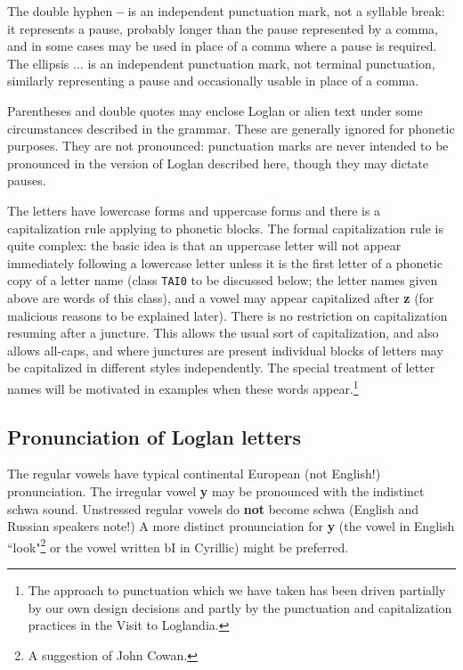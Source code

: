 \documentclass[12pt]{book}
\begin{document}
The double hyphen {\bf --} is an independent punctuation mark, not a syllable break:  it represents a pause, probably longer than the pause represented by a comma, and in some cases may be used in place of a comma where a pause is required.  The ellipsis $\ldots$ is an independent punctuation mark, not terminal punctuation, similarly representing a pause and occasionally usable in place of a comma.

Parentheses and double quotes may enclose Loglan or alien text  under some circumstances described in the grammar.  These are generally ignored for phonetic purposes.  They are not pronounced:  punctuation marks are never intended to be pronounced in the version of Loglan described here, though they may dictate pauses.

The letters have lowercase forms and uppercase forms and there is a capitalization rule applying to phonetic blocks.  The formal capitalization rule is quite complex:  the basic idea is that an uppercase letter will not appear immediately following a lowercase letter unless it is the first letter of a phonetic copy of a letter name (class {\tt TAI0} to be discussed below; the letter names given above are words of this class), and a vowel may appear capitalized after {\bf z} (for malicious reasons to be explained later).    There is no restriction on capitalization resuming after a juncture.  This allows the usual sort of capitalization, and also allows all-caps, and where junctures are present individual blocks of letters may be capitalized in different styles independently.
The special treatment of letter names will be motivated in examples when these words appear.\footnote{The approach to punctuation which we have taken has been driven partially by our own design decisions and partly by the punctuation and capitalization practices in the Visit to Loglandia.}

\subsection{Pronunciation of Loglan letters}

The regular vowels have typical continental European (not English!) pronunciation.  The irregular vowel {\bf y} may be pronounced with the indistinct schwa sound.  Unstressed regular vowels do {\bf not} become schwa (English and Russian speakers note!)  A more distinct pronunciation for {\bf y} (the vowel in English ``look"\footnote{A suggestion of John Cowan.} or the vowel written bI in Cyrillic) might be preferred.
\end{document}
